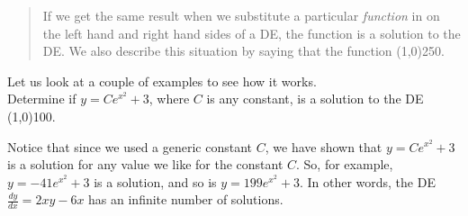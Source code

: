 \documentclass[12pt]{article}
\newcommand{\<}{\langle}
\renewcommand{\>}{\rangle}
\def\ds{\displaystyle}
\begin{document}
	\begin{quote}  If we get the same result when we substitute a particular {\it function} in on the left hand and right 
	hand sides of a DE, the function is a solution to the DE.  We also describe this situation by saying that the function
	\line(1,0){250}.
	\end{quote}
	
\noindent  Let us look at a couple of examples to see how it works.\\

  Determine if $\ds y = Ce^{x^2} + 3$, where $C$ is any constant, is a solution to the DE 
\line(1,0){100.}

%	
\newpage

\noindent  Notice that since we used a generic constant $C$, we have shown that $\ds y = Ce^{x^2} + 3$ is a solution 
for any value we like for the constant $C$.  So, for example, $y = -41e^{x^2} + 3$ is a solution, and so is $y = 199e^{x^2} + 3$.
In other words, the DE $\ds \frac{dy}{dx} = 2xy - 6x$ has an infinite number of solutions.  %
\\
\end{document}
